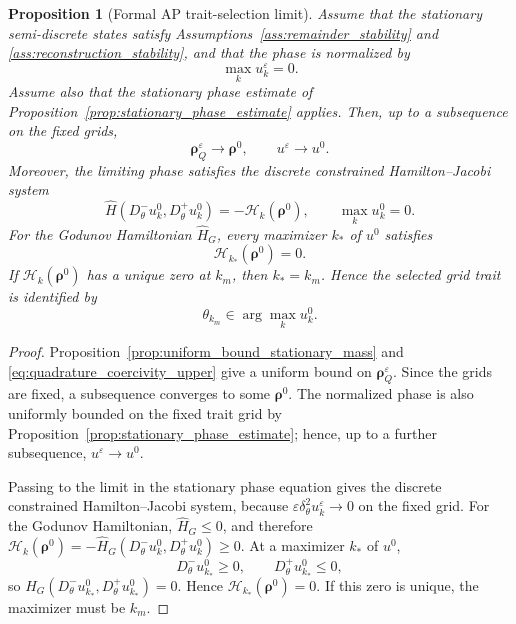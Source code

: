 \documentclass[11pt]{article}
\newtheorem{proposition}{Proposition}[section]
\begin{document}
\begin{proposition}[Formal AP trait-selection limit]
\label{prop:formal_AP_trait_selection}
Assume that the stationary semi-discrete states satisfy
Assumptions~\ref{ass:remainder_stability} and
\ref{ass:reconstruction_stability}, and that the phase is normalized by
\[
    \max_k u_k^\varepsilon=0 .
\]
Assume also that the stationary phase estimate of
Proposition~\ref{prop:stationary_phase_estimate} applies. Then, up to a
subsequence on the fixed grids,
\[
    \boldsymbol\rho_Q^\varepsilon\to \boldsymbol\rho^0,
    \qquad
    u^\varepsilon\to u^0 .
\]
Moreover, the limiting phase satisfies the discrete constrained
Hamilton--Jacobi system
\[
    \widehat H
    \left(
        D_\theta^-u_k^0,
        D_\theta^+u_k^0
    \right)
    =
    -\mathcal H_k(\boldsymbol\rho^0),
    \qquad
    \max_k u_k^0=0 .
\]
For the Godunov Hamiltonian \(\widehat H_G\), every maximizer \(k_*\) of
\(u^0\) satisfies
\[
    \mathcal H_{k_*}(\boldsymbol\rho^0)=0 .
\]
If \(\mathcal H_k(\boldsymbol\rho^0)\) has a unique zero at \(k_m\), then
\(k_*=k_m\). Hence the selected grid trait is identified by
\[
    \theta_{k_m}\in \arg\max_k u_k^0 .
\]
\end{proposition}

\begin{proof}
Proposition~\ref{prop:uniform_bound_stationary_mass} and
\eqref{eq:quadrature_coercivity_upper} give a uniform bound on
\(\boldsymbol\rho_Q^\varepsilon\). Since the grids are fixed, a subsequence
converges to some \(\boldsymbol\rho^0\). The normalized phase is also uniformly
bounded on the fixed trait grid by
Proposition~\ref{prop:stationary_phase_estimate}; hence, up to a further
subsequence, \(u^\varepsilon\to u^0\).

Passing to the limit in the stationary phase equation gives the discrete
constrained Hamilton--Jacobi system, because
\(\varepsilon\delta_\theta^2u_k^\varepsilon\to0\) on the fixed grid. For the
Godunov Hamiltonian, \(\widehat H_G\le0\), and therefore
\(
\mathcal H_k(\boldsymbol\rho^0)=-\widehat H_G(D_\theta^-u_k^0,D_\theta^+u_k^0)
\ge0
\).
At a maximizer \(k_*\) of \(u^0\),
\[
    D_\theta^-u_{k_*}^0\ge0,
    \qquad
    D_\theta^+u_{k_*}^0\le0,
\]
so \(\widehat H_G(D_\theta^-u_{k_*}^0,D_\theta^+u_{k_*}^0)=0\). Hence
\(\mathcal H_{k_*}(\boldsymbol\rho^0)=0\). If this zero is unique, the maximizer
must be \(k_m\).
\end{proof}
\end{document}
